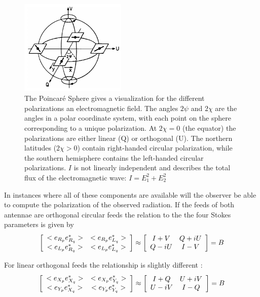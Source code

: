 \begin{figure}
\begin{mdframed}
\centering
\includegraphics[width=0.45\textwidth]{images/poincare_sphere.png}
\caption[The Poincar\'e Sphere]{The Poincar\'e Sphere gives a visualization for the different polarizations an electromagnetic field. The angles $2\psi$ and
$2\chi$ are the angles in a polar coordinate system, with each point on the sphere corresponding to a unique polarization. At $2\chi=0$ (the equator) the polarizations
are either linear (Q) or orthogonal (U). The northern latitudes ($2\chi > 0$) contain right-handed circular polarization, while the southern hemisphere
contains the left-handed circular polarizations. $I$ is not linearly independent and describes the total flux of the electromagnetic wave: 
$I = E_1^2 + E_2^2$ \cite{wilson2009tools}}
\label{fig_poincare}
\end{mdframed}
\end{figure}

In instances where all of these components are available will the observer be able to compute the polarization of
the observed radiation. If the feeds of both antennae are orthogonal circular feeds the relation to
the the four Stokes parameters is given by
\begin{equation}
    \left[\begin{array}{c c}
     <e_{R_p}e_{R_q}^*> & <e_{R_p}e_{L_q}^*> \\
     <e_{L_p}e_{R_q}^*> & <e_{L_p}e_{L_q}^*> \\
    \end{array}\right] \approx 
    \left[\begin{array}{c c}
     I + V & Q + iU \\
     Q - iU & I - V \\
    \end{array}\right] = B
\end{equation}

For linear orthogonal feeds the relationship is slightly different \cite{2011A&A...527A.106S}:
\begin{equation}
    \left[\begin{array}{c c}
     <e_{X_p}e_{X_q}^*> & <e_{X_p}e_{Y_q}^*> \\
     <e_{Y_p}e_{X_q}^*> & <e_{Y_p}e_{Y_q}^*> \\
    \end{array}\right] \approx 
    \left[\begin{array}{c c}
     I + Q & U + iV \\
     U - iV & I - Q \\
    \end{array}\right] = B
\end{equation}

